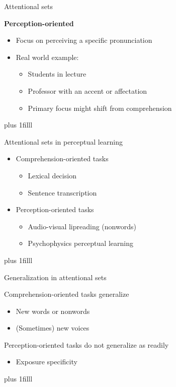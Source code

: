 \documentclass{beamer}
\newcommand{\btVFill}{\vskip0pt plus 1filll}
\begin{document}
\begin{frame}{Attentional sets}

\textbf{Perception-oriented}
\begin{itemize}
\item Focus on perceiving a specific pronunciation
\item Real world example:
\begin{itemize}
\item Students in lecture
\item Professor with an accent or affectation
\item Primary focus might shift from comprehension
\end{itemize}
\end{itemize}
\btVFill
\begin{flushright}
\scriptsize
\citet{Pitt2012}
\end{flushright}
\end{frame}

\begin{frame}{Attentional sets in perceptual learning}

\begin{itemize}
\item Comprehension-oriented tasks
\begin{itemize}
\item Lexical decision
\item Sentence transcription
\end{itemize}
\item Perception-oriented tasks
\begin{itemize}
\item Audio-visual lipreading (nonwords)
\item Psychophysics perceptual learning
\end{itemize}
\end{itemize}

\btVFill
\begin{flushright}
\scriptsize
\citet{Ahissar1993,Norris2003,Vroomen2007, Bradlow2008,Reinisch2014}
\end{flushright}

\end{frame}

\begin{frame}{Generalization in attentional sets}

 Comprehension-oriented tasks generalize
\begin{itemize}
\item New words or nonwords
\item (Sometimes) new voices
\end{itemize}
Perception-oriented tasks do not generalize as readily
\begin{itemize}
\item Exposure specificity
\end{itemize}
\btVFill
\begin{flushright}
\scriptsize
\citet{Ahissar1993, Norris2003, Kraljic2005, Bradlow2008, Pitt2012, Reinisch2013}
\end{flushright}

\end{frame}
\end{document}

